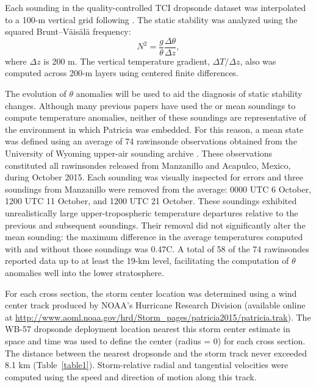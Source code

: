 Each sounding in the quality-controlled TCI dropsonde dataset \citep{BellTCI} was interpolated to a 100-m vertical grid following \cite{MolinariVollaro2010}.
The static stability was analyzed using the squared Brunt–V{\"a}is{\"a}l{\"a} frequency:
   \begin{equation} \label{eq:patricia-n2dry}
   N^2 = \frac{g}{\theta}\frac{\Delta \theta}{\Delta z},
   \end{equation}
where $\Delta z$ is 200 m.
The vertical temperature gradient, $\Delta T/\Delta z$, also was computed across 200-m layers using centered finite differences.

The evolution of $\theta$ anomalies will be used to aid the diagnosis of static stability changes.
Although many previous papers have used the \cite{Jordan1958} or \cite{Dunion2011} mean soundings to compute temperature anomalies, neither of these soundings are representative of the environment in which Patricia was embedded.
For this reason, a mean state was defined using an average of 74 rawinsonde observations obtained from the University of Wyoming upper-air sounding archive \citep{Wyoming2016}.
These observations constituted all rawinsondes released from Manzanillo and Acapulco, Mexico, during October 2015. Each sounding was visually inspected for errors and three soundings from Manzanillo were removed from the average: 0000 UTC 6 October, 1200 UTC 11 October, and 1200 UTC 21 October.
These soundings exhibited unrealistically large upper-tropospheric temperature departures relative to the previous and subsequent soundings.
Their removal did not significantly alter the mean sounding: the maximum difference in the average temperatures computed with and without those soundings was 0.47\textdegree{}C. 
A total of 58 of the 74 rawinsondes reported data up to at least the 19-km level, facilitating the computation of $\theta$ anomalies well into the lower stratosphere.

For each cross section, the storm center location was determined using a wind center track produced by NOAA’s Hurricane Research Division (available online at \url{http://www.aoml.noaa.gov/hrd/Storm_pages/patricia2015/patricia.trak}).
The WB-57 dropsonde deployment location nearest this storm center estimate in space and time was used to define the center (radius = 0) for each cross section.
The distance between the nearest dropsonde and the storm track never exceeded 8.1 km (Table~\ref{table1}).
Storm-relative radial and tangential velocities were computed using the speed and direction of motion along this track.

